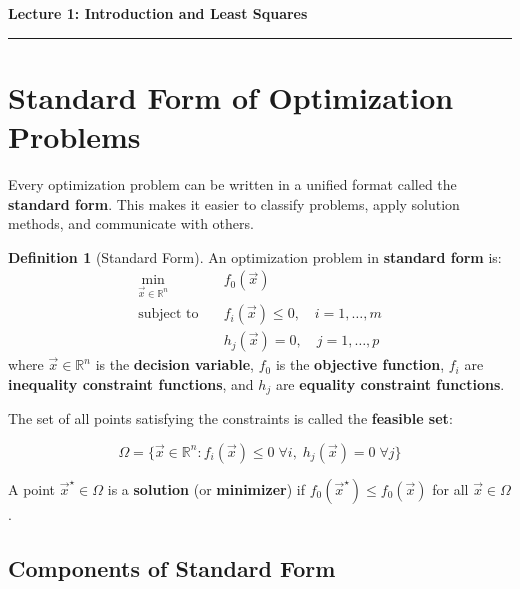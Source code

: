 \documentclass[10pt, twocolumn]{article}
\theoremstyle{definition}
\newtheorem{definition}{Definition}
\theoremstyle{plain}
\newcommand{\RR}{\mathbb{R}}
\begin{document}
\noindent
\begin{minipage}{\linewidth}
    \centering
    \textbf{\Large Lecture 1: Introduction and Least Squares} \\[0.5em]
    \hrule
\end{minipage}
\vspace{1em}

\section{Standard Form of Optimization Problems}

Every optimization problem can be written in a unified format called the \textbf{standard form}. This makes it easier to classify problems, apply solution methods, and communicate with others.

\begin{tcolorbox}
\begin{definition}[Standard Form]
An optimization problem in \textbf{standard form} is:
\[
\begin{aligned}
    \min_{\vec{x} \in \RR^n} \quad & f_0(\vec{x}) \\
    \text{subject to} \quad & f_i(\vec{x}) \le 0, \quad i = 1, \ldots, m \\
    & h_j(\vec{x}) = 0, \quad j = 1, \ldots, p
\end{aligned}
\]
where $\vec{x} \in \RR^n$ is the \textbf{decision variable}, $f_0$ is the \textbf{objective function}, $f_i$ are \textbf{inequality constraint functions}, and $h_j$ are \textbf{equality constraint functions}.
\end{definition}
\end{tcolorbox}

The set of all points satisfying the constraints is called the \textbf{feasible set}:
\begin{result}
\[
    \Omega = \{\vec{x} \in \RR^n : f_i(\vec{x}) \le 0 \; \forall i, \; h_j(\vec{x}) = 0 \; \forall j\}
\]
\end{result}

A point $\vec{x}^\star \in \Omega$ is a \textbf{solution} (or \textbf{minimizer}) if $f_0(\vec{x}^\star) \le f_0(\vec{x})$ for all $\vec{x} \in \Omega$.

\subsection{Components of Standard Form}
\end{document}
